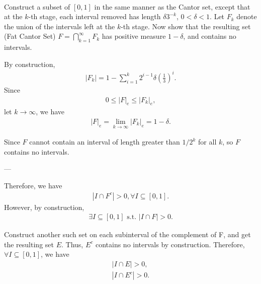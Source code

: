 \documentclass[UTF8,a4paper,10pt]{article}
\begin{document}
  \begin{solution}\,\\

Construct a subset of \([0, 1]\) in the same manner as the Cantor set, except that at the \(k\)-th stage, each interval removed has length \(\delta 3^{-k}\), \(0 < \delta < 1\). Let \(F_k\) denote the union of the intervals left at the \(k\)-th stage.
Now show that the resulting set (Fat Cantor Set) \(F = \bigcap_{k=1}^{\infty} F_k \) has positive measure \(1 - \delta\), and contains no intervals.

By construction,
\begin{equation*}
  \begin{aligned}
    |F_k| = 1 - \sum_{i=1}^{k} 2^{i-1}\delta(\frac{1}{3})^i.
  \end{aligned}
\end{equation*}
Since
\begin{equation*}
  \begin{aligned}
    0\leq|F|_e\leq|F_k|_e,
  \end{aligned}
\end{equation*}
let \(k\to \infty\), we have 
\begin{equation*}
  \begin{aligned}
    |F|_e = \lim_{k \to \infty}|F_k|_e = 1-\delta  .
  \end{aligned}
\end{equation*}

Since \(F\) cannot contain an interval of length greater than \(1/2^k\) for all \(k\), so \(F\) contains no intervals. 

---

Therefore, we have
\begin{equation*}
  \begin{aligned}
    |I\cap F^c| > 0,  \forall I\subseteq[0,1] .
  \end{aligned}
\end{equation*}
However, by construction,
\begin{equation*}
  \begin{aligned}
    \exists I\subseteq[0,1]\text{ s.t. }|I\cap F| > 0.
  \end{aligned}
\end{equation*}

Construct another such set on each subinterval of the complement of F, and get the resulting set \(E\). Thus, \(E^c\) contains no intervals by construction. Therefore, \(\forall I\subseteq[0,1]\), we have
\begin{equation*}
  \begin{aligned}
    |I\cap E| > 0,\\
    |I\cap E^c| > 0.
  \end{aligned}
\end{equation*}

    \end{solution}
\end{document}
